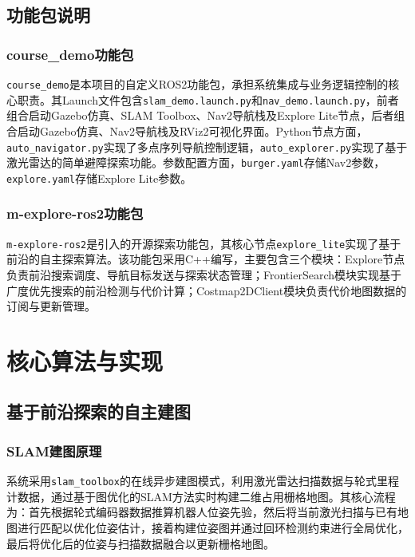 \documentclass[a4paper,12pt]{article}
\begin{document}
\subsection{功能包说明}

\subsubsection{course\_demo功能包}

\texttt{course\_demo}是本项目的自定义ROS2功能包，承担系统集成与业务逻辑控制的核心职责。其Launch文件包含\texttt{slam\_demo.launch.py}和\texttt{nav\_demo.launch.py}，前者组合启动Gazebo仿真、SLAM Toolbox、Nav2导航栈及Explore Lite节点，后者组合启动Gazebo仿真、Nav2导航栈及RViz2可视化界面。Python节点方面，\texttt{auto\_navigator.py}实现了多点序列导航控制逻辑，\texttt{auto\_explorer.py}实现了基于激光雷达的简单避障探索功能。参数配置方面，\texttt{burger.yaml}存储Nav2参数，\texttt{explore.yaml}存储Explore Lite参数。

\subsubsection{m-explore-ros2功能包}

\texttt{m-explore-ros2}是引入的开源探索功能包，其核心节点\texttt{explore\_lite}实现了基于前沿的自主探索算法。该功能包采用C++编写，主要包含三个模块：Explore节点负责前沿搜索调度、导航目标发送与探索状态管理；FrontierSearch模块实现基于广度优先搜索的前沿检测与代价计算；Costmap2DClient模块负责代价地图数据的订阅与更新管理。

\section{核心算法与实现}

\subsection{基于前沿探索的自主建图}

\subsubsection{SLAM建图原理}

系统采用\texttt{slam\_toolbox}的在线异步建图模式，利用激光雷达扫描数据与轮式里程计数据，通过基于图优化的SLAM方法实时构建二维占用栅格地图。其核心流程为：首先根据轮式编码器数据推算机器人位姿先验，然后将当前激光扫描与已有地图进行匹配以优化位姿估计，接着构建位姿图并通过回环检测约束进行全局优化，最后将优化后的位姿与扫描数据融合以更新栅格地图。
\end{document}
